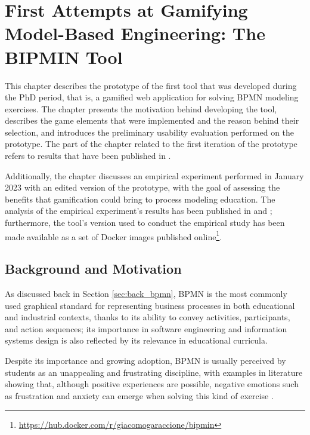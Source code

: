\chapter{First Attempts at Gamifying Model-Based Engineering: The BIPMIN Tool}
\label{ch3}
\graphicspath{{Chapter3/}}

This chapter describes the prototype of the first tool that was developed during the PhD period, that is, a gamified web application for solving BPMN modeling exercises. The chapter presents the motivation behind developing the tool, describes the game elements that were implemented and the reason behind their selection, and introduces the preliminary usability evaluation performed on the prototype. The part of the chapter related to the first iteration of the prototype refers to results that have been published in \cite{bedwell_bipmin_2023}.

Additionally, the chapter discusses an empirical experiment performed in January 2023 with an edited version of the prototype, with the goal of assessing the benefits that gamification could bring to process modeling education. The analysis of the empirical experiment's results has been published in \cite{garaccione_gamification_2023} and \cite{garaccione_gamification_2024}; furthermore, the tool's version used to conduct the empirical study has been made available as a set of Docker images published online\footnote{\url{https://hub.docker.com/r/giacomogaraccione/bipmin}}.


\section{Background and Motivation}

As discussed back in Section \ref{sec:back_bpmn}, BPMN is the most commonly used graphical standard for representing business processes in both educational and industrial contexts, thanks to its ability to convey activities, participants, and action sequences; its importance in software engineering and information systems design is also reflected by its relevance in educational curricula.

Despite its importance and growing adoption, BPMN is usually perceived by students as an unappealing and frustrating discipline, with examples in literature showing that, although positive experiences are possible, negative emotions such as frustration and anxiety can emerge when solving this kind of exercise \cite{Nobre2025ModelQA}. 


